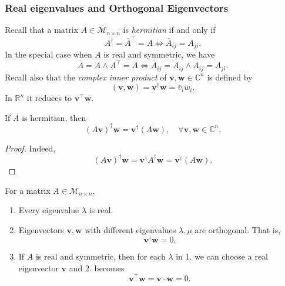 \documentclass[a4paper]{article}
\begin{document}
    \subsubsection{Real eigenvalues and Orthogonal Eigenvectors}
    Recall that a matrix $A\in \mathcal{M}_{n\times n}$ is
    \textit{hermitian} if and only if
    \[
      A^{\dagger}=\overline{A}^{\top}=A \Leftrightarrow
      \overline{A}_{ij}=A_{ji}.
    \]
    In the special case when $A$ is real and symmetric, we have
    \[
      \overline{A}=A \land A^{\top}=A \Leftrightarrow
      \overline{A}_{ij}=A_{ij}\land A_{ij}=A_{ji}.
    \]
    Recall also that the \textit{complex inner product} of
    $\mathbf{v},\mathbf{w} \in \mathbb{C}^{n}$ is defined by
    \[
      (\mathbf{v},\mathbf{w})= \mathbf{v}^\dagger \mathbf{w}= \bar{v}_i w_i.
    \]
    In $ \mathbb{R}^{n} $ it reduces to $ \mathbf{v}^{\top} \mathbf{w} $.
    \begin{lemma}
      If $A$ is hermitian, then
      \[
        (A\mathbf{v})^\dagger \mathbf{w}=\mathbf{v}^\dagger
        (A\mathbf{w}),\quad \forall \mathbf{v},\mathbf{w}\in \mathbb{C}^{n}.
      \]
    \end{lemma}
    \begin{proof}
      Indeed,
      \[
        (A\mathbf{v})^\dagger \mathbf{w} = \mathbf{v}^\dagger
        A^\dagger \mathbf{w} = \mathbf{v}^\dagger (A\mathbf{w}).
      \]
    \end{proof}
    \begin{theorem}\label{thm:eigen for hermitians}
      For a matrix $ A\in \mathcal{M}_{n\times n} $,
      \begin{enumerate}
        \item Every eigenvalue $ \lambda $ is real.
        \item Eigenvectors $ \mathbf{v},\mathbf{w} $ with different
          eigenvalues $ \lambda,\mu $ are orthogonal. That is,
          \[
            \mathbf{v}^\dagger \mathbf{w}=0.
          \]
        \item If $A$ is real and symmetric, then for each $ \lambda $
          in 1. we can choose a real eigenvector $ \mathbf{v} $ and 2. becomes
          \[
            \mathbf{v}^{\top}\mathbf{w}=\mathbf{v} \cdot \mathbf{w}=0.
          \]
      \end{enumerate}
    \end{theorem}
\end{document}
